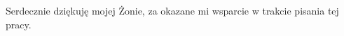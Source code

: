 \begin{flushright}
Serdecznie dziękuję mojej Żonie, za okazane mi wsparcie w trakcie pisania tej pracy.
\end{flushright}